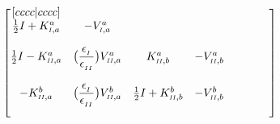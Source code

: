 \documentclass{article}
\newcommand{\RomCap}[1]
    {\MakeUppercase{\scaleto{\romannumeral #1}{3.5pt}}}
\newcommand{\myfrac}[3][0pt]{\genfrac{}{}{}{}{\raisebox{#1}{$#2$}}{\raisebox{-#1}{$#3$}}}
\begin{document}
    \begin{equation}
    	\begin{bmatrix}[cccc|cccc]
    		\\
            \iffalse
	     	Row 1 : A_{11} & A_{12} &
			\fi

            \frac{1}{2}I+K^{a}_{\RomCap{1},a} & -V^{a}_{\RomCap{1},a} & 	

            \iffalse
	     	A_{31} & A_{41} & A_{51} & A_{61} & A_{71} & A_{81} \\
			\fi

             &  &  &  &  &  \\ 
             &  &  &  &  &  &  & \\
	     	
	     	\iffalse
	     	Row 2 : A_{21} &
			\fi
			
			\frac{1}{2}I-K^{a}_{\RomCap{2},a} & 	
			
			\iffalse
	     	A_{22} &
			\fi
	     	
	     	\big(\myfrac[3pt]{\epsilon_{_\RomCap{1}}}{\epsilon_{_\RomCap{2}}}\big)V^{a}_{\RomCap{2},a} &
	     	
	     	\iffalse
	     	A_{23} & A_{24} &
			\fi

			K^{a}_{\RomCap{2},b} & -V^{a}_{\RomCap{2},b} & 

	     	\iffalse
	     	A_{25} & A_{26} & A_{27} & A_{28} \\
	     	\fi
			
	     	 &	 &  &  \\ 
             &  &  &  &  &  &  & \\
	     	\iffalse
	     	Row 3 : A_{31} &
			\fi
			
			-K^{b}_{\RomCap{2},a} & 	
			
			\iffalse
	     	A_{32} &
			\fi
	     	
	     	\big(\myfrac[3pt]{\epsilon_{_\RomCap{1}}}{\epsilon_{_\RomCap{2}}}\big)V^{b}_{\RomCap{2},a} &
	     	
	     	\iffalse
	     	A_{33} & A_{34} &
			\fi

			\frac{1}{2}I+K^{b}_{\RomCap{2},b} & -V^{b}_{\RomCap{2},b} &

	     	\iffalse
	     	A_{35} & A_{36} & A_{37} & A_{38} \\
	     	\fi
			
	     	 &	 &  & \\ 
             &  &  &  &  &  &  & \\
	     	\iffalse
	     	Row 4 : A_{41} & A_{42} &
			\fi
			

\end{bmatrix}
\end{equation}
\end{document}
